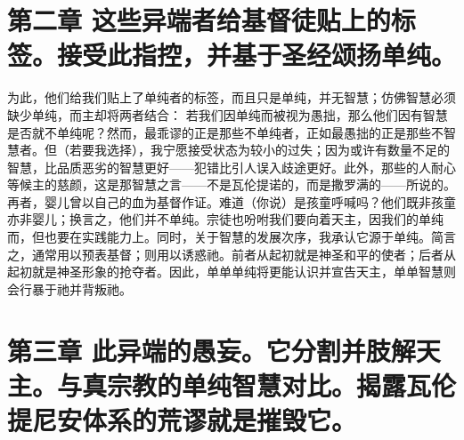 \section{第二章 这些异端者给基督徒贴上的标签。接受此指控，并基于圣经颂扬单纯。}

为此，他们给我们贴上了单纯者的标签，而且只是单纯，并无智慧；仿佛智慧必须缺少单纯，而主却将两者结合： 若我们因单纯而被视为愚拙，那么他们因有智慧是否就不单纯呢？然而，最乖谬的正是那些不单纯者，正如最愚拙的正是那些不智慧者。但（若要我选择），我宁愿接受状态为较小的过失；因为或许有数量不足的智慧，比品质恶劣的智慧更好——犯错比引人误入歧途更好。此外，那些的人耐心等候主的慈颜，这是那智慧之言——不是瓦伦提诺的，而是撒罗满的——所说的。 再者，婴儿曾以自己的血为基督作证。难道（你说）是孩童呼喊吗？他们既非孩童亦非婴儿；换言之，他们并不单纯。宗徒也吩咐我们要向着天主，因我们的单纯而，但也要在实践能力上。同时，关于智慧的发展次序，我承认它源于单纯。简言之，通常用以预表基督；则用以诱惑祂。前者从起初就是神圣和平的使者；后者从起初就是神圣形象的抢夺者。因此，单单单纯将更能认识并宣告天主，单单智慧则会行暴于祂并背叛祂。\par


\section{第三章 此异端的愚妄。它分割并肢解天主。与真宗教的单纯智慧对比。揭露瓦伦提尼安体系的荒谬就是摧毁它。}


